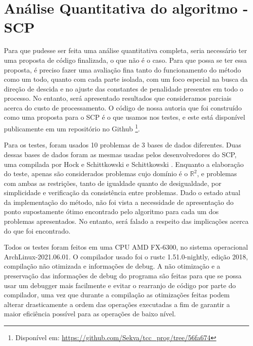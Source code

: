 \section{Análise Quantitativa do algoritmo - SCP}

\noindent
Para que pudesse ser feita uma análise quantitativa completa, seria necessário ter uma
proposta de código finalizada, o que não é o caso. Para que possa se ter essa proposta,
é preciso fazer uma avaliação fina tanto do funcionamento do método como um todo, quanto
com cada parte isolada, com um foco especial na busca da direção de descida e no ajuste
das constantes de penalidade presentes em todo o processo. No entanto, será apresentado
resultados que consideramos parciais acerca do custo de processamento.
O código de nossa autoria que foi construído como uma proposta para o SCP é
o que usamos nos testes, e este está disponível publicamente em um repositório no Github
\footnote{Disponível em: \url{https://github.com/Sekva/tcc_prog/tree/56fa674}}.

Para os testes, foram usados 10 problemas de 3 bases de dados diferentes.
Duas dessas bases de dados foram as mesmas usadas pelos desenvolvedores do
SCP, uma compilada por Hock e Schittkowski \cite{Hock1981}
e Schittkowski \cite{Schittkowski1987}. Enquanto a elaboração do teste, apenas são
considerados problemas cujo domínio é o \(\mathbb{R}^2\), e problemas com ambas as
restrições, tanto de igualdade quanto de desigualdade, por simplicidade e
verificação da consistência entre problemas. Dado o estado atual da implementação do
método, não foi vista a necessidade de apresentação do ponto supostamente ótimo
encontrado pelo algoritmo para cada um dos problemas apresentados. No entanto,
será falado a respeito das implicações acerca do que foi encontrado.

Todos os testes foram feitos em uma CPU AMD FX-6300, no sistema operacional
ArchLinux-2021.06.01. O compilador usado foi o rustc 1.51.0-nightly, edição 2018,
compilação não otimizada e informações de debug. A não otimização e a preservação
das informações de debug do programa são feitas para que se possa usar um debugger
mais facilmente e evitar o rearranjo de código por parte do compilador, uma vez
que durante a compilação as otimizações feitas podem alterar drasticamente a
ordem das operações executadas a fim de garantir a maior eficiência possível
para as operações de baixo nível.

